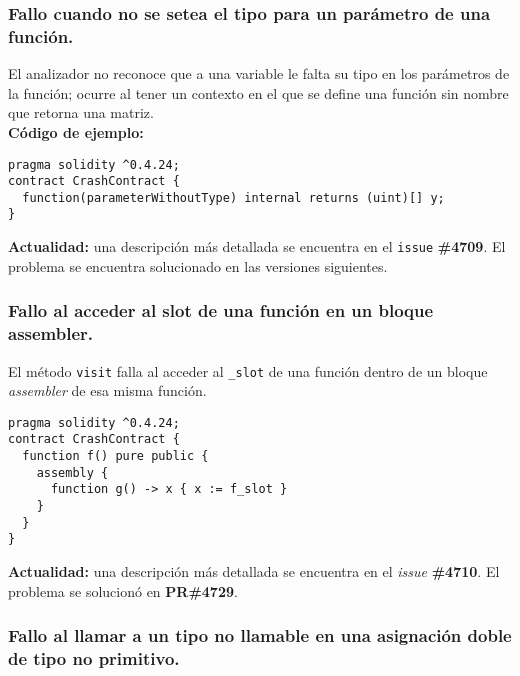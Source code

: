 \subsubsection{Fallo cuando no se setea el tipo para un parámetro de una función.}

El analizador no reconoce que a una variable le falta su tipo en los parámetros de la función; ocurre al tener un contexto en el que se define una función sin nombre que retorna una matriz.\\

\textbf{Código de ejemplo:}
\begin{lstlisting}[language=Solidity, caption={Código de ejemplo para parámetro de función sin tipo}]
pragma solidity ^0.4.24;
contract CrashContract {
  function(parameterWithoutType) internal returns (uint)[] y;
}
\end{lstlisting}

\textbf{Actualidad:} una descripción más detallada se encuentra en el \texttt{issue} \textbf{\#4709}\cite{GHI4709}. El problema se encuentra solucionado en las versiones siguientes. \\

\subsubsection{Fallo al acceder al slot de una función en un bloque assembler.}

El método \texttt{visit} falla al acceder al \texttt{\_slot} de una función dentro de un bloque \textit{assembler} de esa misma función.\\

\begin{lstlisting}[language=Solidity, caption={Código de ejemplo de fallo accediento a \texttt{\_slot}}]
pragma solidity ^0.4.24;
contract CrashContract {
  function f() pure public {
    assembly {
      function g() -> x { x := f_slot }
    }
  }
}
\end{lstlisting}

\textbf{Actualidad:} una descripción más detallada se encuentra en el \textit{issue} \textbf{\#4710}\cite{GHI4710}. El problema se solucionó en \textbf{PR\#4729}\cite{GHPR4729}.\\

\subsubsection{Fallo al llamar a un tipo no llamable en una asignación doble de tipo no primitivo.}

